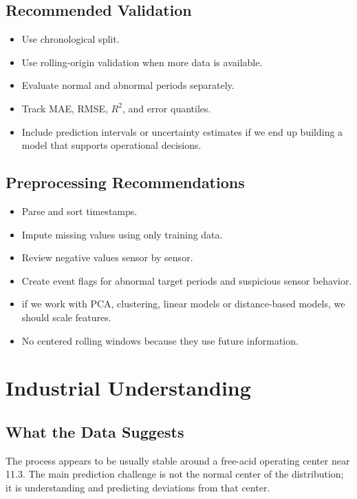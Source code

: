 \documentclass[11pt,a4paper]{article}
\begin{document}
\subsection{Recommended Validation}

\begin{itemize}
    \item Use chronological split.
    \item Use rolling-origin validation when more data is available.
    \item Evaluate normal and abnormal periods separately.
    \item Track MAE, RMSE, $R^2$, and error quantiles.
    \item Include prediction intervals or uncertainty estimates if we end up building a model that supports operational decisions.
\end{itemize}

\subsection{Preprocessing Recommendations}

\begin{itemize}
    \item Parse and sort timestamps.
    \item Impute missing values using only training data.
    \item Review negative values sensor by sensor.
    \item Create event flags for abnormal target periods and suspicious sensor behavior.
    \item if we work with PCA, clustering, linear models or distance-based models, we should scale features.
    \item No centered rolling windows because they use future information.
\end{itemize}

\section{Industrial Understanding}

\subsection{What the Data Suggests}

The process appears to be usually stable around a free-acid operating center near 11.3. The main prediction challenge is not the normal center of the distribution; it is understanding and predicting deviations from that center.
\end{document}
